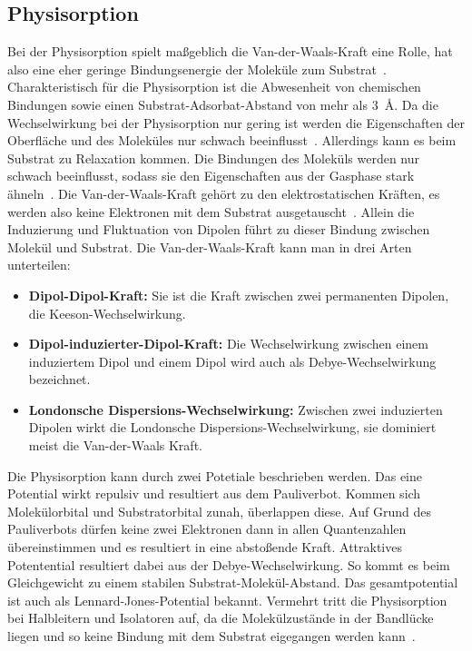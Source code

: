         \subsection{Physisorption}
            Bei der Physisorption spielt maßgeblich die Van-der-Waals-Kraft eine Rolle, hat also eine eher geringe Bindungsenergie der Moleküle zum Substrat~\cite{cinchetti_activating_2017}.
            Charakteristisch für die Physisorption ist die Abwesenheit von chemischen Bindungen sowie einen Substrat-Adsorbat-Abstand von mehr als \SI{3}{\angstrom}. %
            Da die Wechselwirkung bei der Physisorption nur gering ist werden die Eigenschaften der Oberfläche und des Moleküles nur schwach beeinflusst~\cite{bergenti_spinterface_2019}.
            Allerdings kann es beim Substrat zu Relaxation kommen.
            Die Bindungen des Moleküls werden nur schwach beeinflusst, sodass sie den Eigenschaften aus der Gasphase stark ähneln~\cite{cinchetti_activating_2017}.
            Die Van-der-Waals-Kraft gehört zu den elektrostatischen Kräften, es werden also keine Elektronen mit dem Substrat ausgetauscht~\cite{bergenti_spinterface_2019}.
            Allein die Induzierung und Fluktuation von Dipolen führt zu dieser Bindung zwischen Molekül und Substrat.
            Die Van-der-Waals-Kraft kann man in drei Arten unterteilen:
            \begin{itemize}
                \item \textbf{Dipol-Dipol-Kraft:} Sie ist die Kraft zwischen zwei permanenten Dipolen, die Keeson-Wechselwirkung.
                \item \textbf{Dipol-induzierter-Dipol-Kraft:} Die Wechselwirkung zwischen einem induziertem Dipol und einem Dipol wird auch als Debye-Wechselwirkung bezeichnet.
                \item \textbf{Londonsche Dispersions-Wechselwirkung:} Zwischen zwei induzierten Dipolen wirkt die Londonsche Dispersions-Wechselwirkung, sie dominiert meist die Van-der-Waals Kraft.
            \end{itemize}

            Die Physisorption kann durch zwei Potetiale beschrieben werden.
            Das eine Potential wirkt repulsiv und resultiert aus dem Pauliverbot.
            Kommen sich Molekülorbital und Substratorbital zunah, überlappen diese.
            Auf Grund des Pauliverbots dürfen keine zwei Elektronen dann in allen Quantenzahlen übereinstimmen und es resultiert in eine abstoßende Kraft.
            Attraktives Potentential resultiert dabei aus der Debye-Wechselwirkung.
            So kommt es beim Gleichgewicht zu einem stabilen Substrat-Molekül-Abstand.
            Das gesamtpotential ist auch als Lennard-Jones-Potential bekannt.
            Vermehrt tritt die Physisorption bei Halbleitern und Isolatoren auf, da die Molekülzustände in der Bandlücke liegen und so keine Bindung mit dem Substrat eigegangen werden kann~\cite{IF_1}.
        

